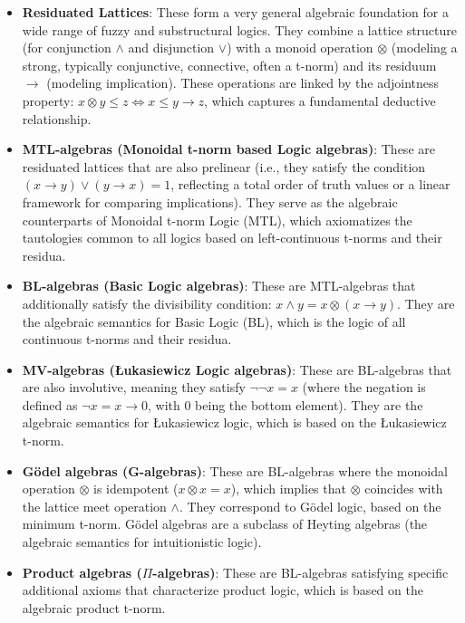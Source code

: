 \begin{itemize}
    \item \textbf{Residuated Lattices}: These form a very general algebraic foundation for a wide range of fuzzy and substructural logics. They combine a lattice structure (for conjunction $\wedge$ and disjunction $\vee$) with a monoid operation $\otimes$ (modeling a strong, typically conjunctive, connective, often a t-norm) and its residuum $\rightarrow$ (modeling implication). These operations are linked by the adjointness property: $x \otimes y \leq z \iff x \leq y \rightarrow z$, which captures a fundamental deductive relationship.
    \item \textbf{MTL-algebras (Monoidal t-norm based Logic algebras)}: These are residuated lattices that are also prelinear (i.e., they satisfy the condition $(x \rightarrow y) \vee (y \rightarrow x) = 1$, reflecting a total order of truth values or a linear framework for comparing implications). They serve as the algebraic counterparts of Monoidal t-norm Logic (MTL), which axiomatizes the tautologies common to all logics based on left-continuous t-norms and their residua.
    \item \textbf{BL-algebras (Basic Logic algebras)}: These are MTL-algebras that additionally satisfy the divisibility condition: $x \wedge y = x \otimes (x \rightarrow y)$. They are the algebraic semantics for Basic Logic (BL), which is the logic of all continuous t-norms and their residua.
    \item \textbf{MV-algebras (Łukasiewicz Logic algebras)}: These are BL-algebras that are also involutive, meaning they satisfy $\neg \neg x = x$ (where the negation is defined as $\neg x = x \rightarrow 0$, with $0$ being the bottom element). They are the algebraic semantics for Łukasiewicz logic, which is based on the Łukasiewicz t-norm.
    \item \textbf{Gödel algebras (G-algebras)}: These are BL-algebras where the monoidal operation $\otimes$ is idempotent ($x \otimes x = x$), which implies that $\otimes$ coincides with the lattice meet operation $\wedge$. They correspond to Gödel logic, based on the minimum t-norm. Gödel algebras are a subclass of Heyting algebras (the algebraic semantics for intuitionistic logic).
    \item \textbf{Product algebras ($\Pi$-algebras)}: These are BL-algebras satisfying specific additional axioms that characterize product logic, which is based on the algebraic product t-norm.
\end{itemize}

















